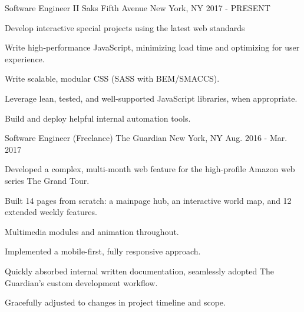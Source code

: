 

\begin{cventries}

  \cventry
    {Software Engineer II} %
    {Saks Fifth Avenue} %
    {New York, NY} %
    {2017 - PRESENT} %
    {
      \begin{cvitems} %
       \item {Develop interactive special projects using the latest web standards}
       \item {Write high-performance JavaScript, minimizing load time and optimizing for user experience.}
       \item {Write scalable, modular CSS (SASS with BEM/SMACCS).}
       \item {Leverage lean, tested, and well-supported JavaScript libraries, when appropriate.}
       \item {Build and deploy helpful internal automation tools.}
      \end{cvitems}
    }

  \cventry
    {Software Engineer (Freelance)} %
    {The Guardian} %
    {New York, NY} %
    {Aug. 2016 - Mar. 2017} %
    {
      \begin{cvitems} %
        \item {Developed a complex, multi-month web feature for the high-profile Amazon web series The Grand Tour.}
        \item {Built 14 pages from scratch: a mainpage hub, an interactive world map, and 12 extended weekly features.}
        \item {Multimedia modules and animation throughout.}
        \item {Implemented a mobile-first, fully responsive approach.}
        \item {Quickly absorbed internal written documentation, seamlessly adopted The Guardian’s custom development workflow.}
        \item {Gracefully adjusted to changes in project timeline and scope.}
      \end{cvitems}
    }


\end{cventries}
